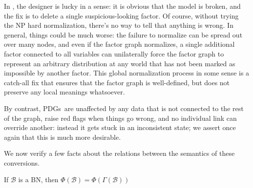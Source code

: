 \documentclass{article}
\newcommand{\bmu}{\boldsymbol{\mu}}
\newcommand{\Ed}{\mathcal E}
\newcommand{\MN}{PDG}
\newcommand{\MNs}{\MN s}
\numberwithin{equation}{section}
\begin{document}
\begin{notfocus}
	In , the designer is lucky in a sense: it is obvious that the model is broken, and the fix is to delete a single suspicious-looking factor. Of course, without trying the NP hard normalization, there's no way to tell that anything is wrong. In general, things could be much worse: the failure to normalize can be spread out over many nodes, and even if the factor graph normalizes, a single additional factor connected to all variables can unilaterally force the factor graph to represent an arbitrary distribution at any world that has not been marked as impossible by another factor. This global normalization process in some sense is a catch-all fix that ensures that the factor graph is well-defined, but does not preserve any local meanings whatsoever.
	
	
	By contrast, \MNs\ are unaffected by any data that is not connected  to the rest of the graph, raise red flags when things go wrong, and no individual link can override another: instead it gets stuck in an inconsistent state; we assert once again that this is much more desirable.
	
	
	

	
	We now verify a few facts about the relations between the semantics of these conversions.
	
	
	\begin{prop} \label{prop:}
		If $\mathcal B$ is a BN, then $\Phi(\mathcal B) = \Phi(\Gamma(\mathcal B))$
	\end{prop}
	

\end{notfocus}
\end{document}

